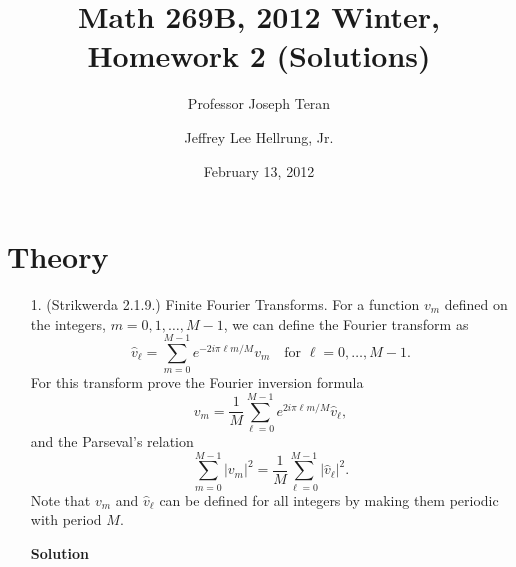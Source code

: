 \documentclass{article}
\providecommand{\abs}[1]{\left\lvert#1\right\rvert}
\begin{document}
\title{Math 269B, 2012 Winter, Homework 2 (Solutions)}
\date{February 13, 2012}
\author{Professor Joseph Teran \and Jeffrey Lee Hellrung, Jr.}
\maketitle

\section{Theory}

\begin{itemize}

\item[1.] (Strikwerda 2.1.9.) Finite Fourier Transforms. For a function $v_m$ defined on the integers, $m = 0, 1, \dotsc, M-1$, we can define the Fourier transform as
\begin{equation*}
\hat{v}_{\ell} = \sum_{m=0}^{M-1} e^{-2i\pi\ell m/M} v_m \quad \text{for } \ell = 0, \dotsc, M-1.
\end{equation*}
For this transform prove the Fourier inversion formula
\begin{equation*}
v_m = \frac{1}{M} \sum_{\ell=0}^{M-1} e^{2i\pi\ell m/M} \hat{v}_{\ell},
\end{equation*}
and the Parseval's relation
\begin{equation*}
\sum_{m=0}^{M-1} \abs{v_m}^2 = \frac{1}{M} \sum_{\ell=0}^{M-1} \abs{\hat{v}_{\ell}}^2.
\end{equation*}
Note that $v_m$ and $\hat{v}_{\ell}$ can be defined for all integers by making them periodic with period $M$.

\textbf{Solution}


\end{itemize}
\end{document}
